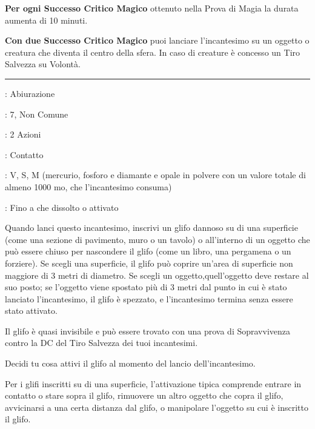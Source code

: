 \begin{multicols}{2}
\textbf{Per ogni Successo Critico Magico} ottenuto nella Prova di Magia la durata aumenta di 10 minuti.

\textbf{Con due Successo Critico Magico} puoi lanciare l'incantesimo su un oggetto o creatura che diventa il centro della sfera. In caso di creature è concesso un Tiro Salvezza su Volontà.

\smallskip\noindent\rule{\linewidth}{2pt} \hypertarget{Simbolo}{}\smallskip{}
\noindent
\begin{description}[noitemsep, topsep=0pt, parsep=0pt, partopsep=0pt, leftmargin=0cm, labelwidth=2.8cm]
	\item[\textbf{Lista di Magia}]: Abiurazione
	\item[\textbf{Livello}]: 7, Non Comune
	\item[\textbf{T. di Lancio}]: 2 Azioni
	\item[\textbf{Gittata}]: Contatto
	\item[\textbf{Componenti}]: V, S, M (mercurio, fosforo e diamante e opale in polvere con un valore totale di almeno 1000 mo, che l'incantesimo consuma)
	\item[\textbf{Durata}]: Fino a che dissolto o attivato
\end{description}

Quando lanci questo incantesimo, inscrivi un glifo dannoso su di una superficie (come una sezione di pavimento, muro o un tavolo) o all'interno di un oggetto che può essere chiuso per nascondere il glifo (come un libro, una pergamena o un forziere). Se scegli una superficie, il glifo può coprire un'area di superficie non maggiore di 3 metri di diametro. Se scegli un oggetto,quell'oggetto deve restare al suo posto; se l'oggetto viene spostato più di 3 metri dal punto in cui è stato lanciato l'incantesimo, il glifo è spezzato, e l'incantesimo termina senza essere stato attivato.

Il glifo è quasi invisibile e può essere trovato con una prova di Sopravvivenza contro la DC del Tiro Salvezza dei tuoi incantesimi.

Decidi tu cosa attivi il glifo al momento del lancio dell'incantesimo.

Per i glifi inscritti su di una superficie, l'attivazione tipica comprende entrare in contatto o stare sopra il glifo, rimuovere un altro oggetto che copra il glifo, avvicinarsi a una certa distanza dal glifo, o manipolare l'oggetto su cui è inscritto il glifo.


\end{multicols}
